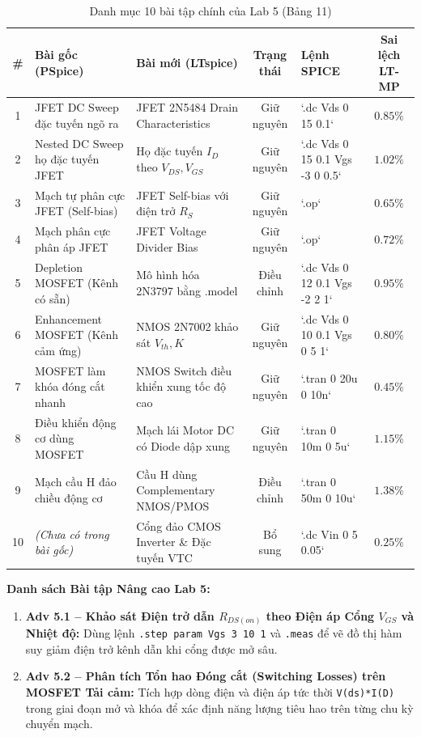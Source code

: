 \documentclass[12pt,a4paper]{report}
\begin{document}
\begin{table}[H]
\centering
\caption{Danh mục 10 bài tập chính của Lab 5 (Bảng 11)}
\label{tab:lab5_details}
\renewcommand{\arraystretch}{1.2}
\small
\begin{tabularx}{\textwidth}{|c|p{4.2cm}|p{4.0cm}|c|l|c|}
\hline
\rowcolor{codebg}
\textbf{\#} & \textbf{Bài gốc (PSpice)} & \textbf{Bài mới (LTspice)} & \textbf{Trạng thái} & \textbf{Lệnh SPICE} & \textbf{Sai lệch LT-MP} \\ \hline
1 & JFET DC Sweep đặc tuyến ngõ ra & JFET 2N5484 Drain Characteristics & Giữ nguyên & `.dc Vds 0 15 0.1` & $0.85\%$ \\ \hline
2 & Nested DC Sweep họ đặc tuyến JFET & Họ đặc tuyến $I_D$ theo $V_{DS}, V_{GS}$ & Giữ nguyên & `.dc Vds 0 15 0.1 Vgs -3 0 0.5` & $1.02\%$ \\ \hline
3 & Mạch tự phân cực JFET (Self-bias) & JFET Self-bias với điện trở $R_S$ & Giữ nguyên & `.op` & $0.65\%$ \\ \hline
4 & Mạch phân cực phân áp JFET & JFET Voltage Divider Bias & Giữ nguyên & `.op` & $0.72\%$ \\ \hline
5 & Depletion MOSFET (Kênh có sẵn) & Mô hình hóa 2N3797 bằng .model & Điều chỉnh & `.dc Vds 0 12 0.1 Vgs -2 2 1` & $0.95\%$ \\ \hline
6 & Enhancement MOSFET (Kênh cảm ứng) & NMOS 2N7002 khảo sát $V_{th}, K$ & Giữ nguyên & `.dc Vds 0 10 0.1 Vgs 0 5 1` & $0.80\%$ \\ \hline
7 & MOSFET làm khóa đóng cắt nhanh & NMOS Switch điều khiển xung tốc độ cao & Giữ nguyên & `.tran 0 20u 0 10n` & $0.45\%$ \\ \hline
8 & Điều khiển động cơ dùng MOSFET & Mạch lái Motor DC có Diode dập xung & Giữ nguyên & `.tran 0 10m 0 5u` & $1.15\%$ \\ \hline
9 & Mạch cầu H đảo chiều động cơ & Cầu H dùng Complementary NMOS/PMOS & Điều chỉnh & `.tran 0 50m 0 10u` & $1.38\%$ \\ \hline
10 & \textit{(Chưa có trong bài gốc)} & Cổng đảo CMOS Inverter \& Đặc tuyến VTC & Bổ sung & `.dc Vin 0 5 0.05` & $0.25\%$ \\ \hline
\end{tabularx}
\end{table}

\textbf{Danh sách Bài tập Nâng cao Lab 5:}
\begin{enumerate}
    \item \textbf{Adv 5.1 -- Khảo sát Điện trở dẫn $R_{DS(on)}$ theo Điện áp Cổng $V_{GS}$ và Nhiệt độ:} Dùng lệnh \lstinline|.step param Vgs 3 10 1| và \lstinline|.meas| để vẽ đồ thị hàm suy giảm điện trở kênh dẫn khi cổng được mở sâu.
    \item \textbf{Adv 5.2 -- Phân tích Tổn hao Đóng cắt (Switching Losses) trên MOSFET Tải cảm:} Tích hợp dòng điện và điện áp tức thời \lstinline|V(ds)*I(D)| trong giai đoạn mở và khóa để xác định năng lượng tiêu hao trên từng chu kỳ chuyển mạch.
\end{enumerate}
\end{document}

